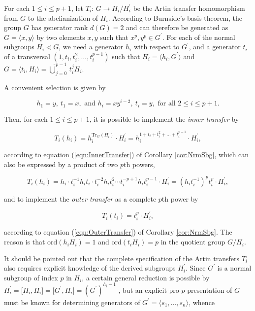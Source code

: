 \documentclass{amsart}
\theoremstyle{definition}
\numberwithin{equation}{section}
\begin{document}
For each \(1\le i\le p+1\),
let \(T_i:\,G\to H_i/H_i^\prime\) be the Artin transfer homomorphism from \(G\) to the abelianization of \(H_i\).
According to Burnside's basis theorem, the group \(G\) has generator rank \(d(G)=2\)
and can therefore be generated as \(G=\langle x,y\rangle\) by two elements \(x,y\) such that \(x^p,y^p\in G^\prime\).
For each of the normal subgroups \(H_i\lhd G\), we need
a generator \(h_i\) with respect to \(G^\prime\),
and a generator \(t_i\) of a transversal \((1,t_i,t_i^2,\ldots,t_i^{p-1})\) such that
\(H_i=\langle h_i,G^\prime\rangle\) and \(G=\langle t_i,H_i\rangle=\dot{\bigcup}_{j=0}^{p-1}\,t_i^jH_i\).

A convenient selection is given by

\begin{equation}
\label{eqn:GenAndTrvPxP}
h_1=y,\ t_1=x, \text{ and } h_i=xy^{i-2},\ t_i=y, \text{ for all } 2\le i\le p+1.
\end{equation}

\noindent
Then, for each \(1\le i\le p+1\), it is possible to implement the \textit{inner transfer} by

\begin{equation}
\label{eqn:InnerATPxP}
T_i(h_i)=h_i^{\mathrm{Tr}_G(H_i)}\cdot H_i^\prime=h_i^{1+t_i+t_i^2+\ldots +t_i^{p-1}}\cdot H_i^\prime,
\end{equation}

\noindent
according to equation
(\ref{eqn:InnerTransfer})
of Corollary
\ref{cor:NrmSbg},
which can also be expressed by a product of two \(p\)th powers,

\begin{equation}
\label{eqn:InnerATVarPxP}
T_i(h_i)
=h_i\cdot t_i^{-1}h_it_i\cdot t_i^{-2}h_it_i^2\cdots t_i^{-p+1}h_it_i^{p-1}\cdot H_i^\prime
=(h_it_i^{-1})^pt_i^p\cdot H_i^\prime,
\end{equation}

\noindent
and to implement the \textit{outer transfer} as a complete \(p\)th power by

\begin{equation}
\label{eqn:OuterATPxP}
T_i(t_i)=t_i^p\cdot H_i^\prime,
\end{equation}

\noindent
according to equation
(\ref{eqn:OuterTransfer})
of Corollary
\ref{cor:NrmSbg}.
The reason is that \(\mathrm{ord}(h_iH_i)=1\) and \(\mathrm{ord}(t_iH_i)=p\) in the quotient group \(G/H_i\).

It should be pointed out that the complete specification of the Artin transfers \(T_i\)
also requires explicit knowledge of the derived subgroups \(H_i^\prime\).
Since \(G^\prime\) is a normal subgroup of index \(p\) in \(H_i\),
a certain general reduction is possible by
\(H_i^\prime=\lbrack H_i,H_i\rbrack=\lbrack G^\prime,H_i\rbrack=(G^\prime)^{h_i-1}\)
\cite[Lem.2.1, p.52]{Bl},
but an explicit pro-\(p\) presentation of \(G\) must be known
for determining generators of \(G^\prime=\langle s_1,\ldots,s_n\rangle\),
whence
\end{document}
